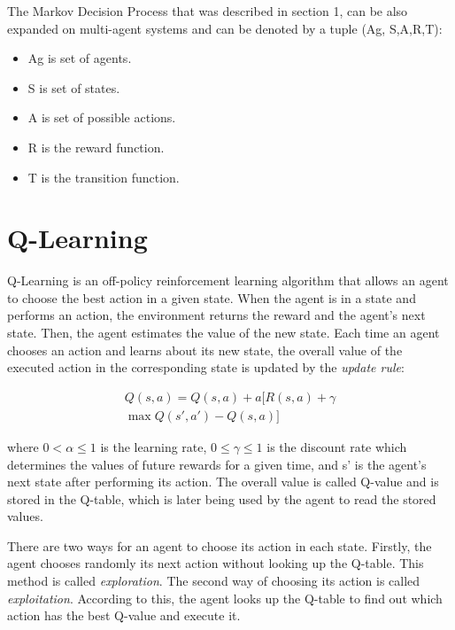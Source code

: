 \documentclass[10pt,a4paper,twocolumn]{article}
\begin{document}
	The Markov Decision Process that was described in section 1, can be also expanded on multi-agent systems and can be denoted by a tuple (Ag, S,A,R,T):
	
	\begin{itemize}
		\item Ag is set of agents. 
		\item S is set of states.
		\item A is set of possible actions.
		\item R is the reward function.
		\item T is the transition function.
	\end{itemize}


	\section{Q-Learning}
	Q-Learning is an off-policy reinforcement learning algorithm that allows an agent to choose the best action in a given state. When the agent is in a state and performs an action, the environment returns the reward and the agent’s next state. Then, the agent estimates the value of the new state. Each time an agent chooses an action and learns about its new state, the overall value of the executed action in the corresponding state is updated by the \textit{update rule}:
	
	\begin{equation}
		\begin{aligned}
			Q(s,a) = Q(s,a) + a[R(s,a) + \gamma \\
			\max{Q(s',a') }- Q(s,a)]
		\end{aligned}
	\end{equation}
	
	where $0 < \alpha \le 1$ is the learning rate, $0 \le \gamma \le 1$ is the discount rate which determines the values of future rewards for a given time, and s' is the agent’s next state after performing its action. The overall value is called Q-value and is stored in the Q-table, which is later being used by the agent to read the stored values.
	
	There are two ways for an agent to choose its action in each state. Firstly, the agent chooses randomly its next action without looking up the Q-table. This method is called \textit{exploration}. The second way of choosing its action is called \textit{exploitation}. According to this, the agent looks up the Q-table to find out which action has the best Q-value and execute it.
	
\end{document}
